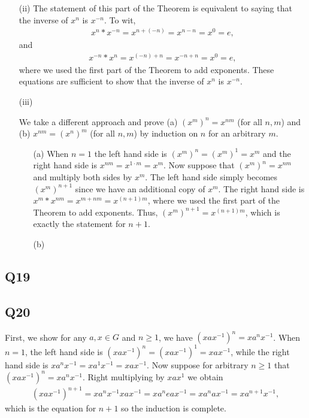 \documentclass[12pt]{article}
\numberwithin{theorem}{section}
\numberwithin{equation}{section}
\numberwithin{remark}{section}
\numberwithin{definition}{section}
\numberwithin{theorem}{section}
\numberwithin{lemma}{section}
\numberwithin{example}{section}
\begin{document}
\begin{itemize}
	\item[(ii)]{The statement of this part of the Theorem is equivalent to saying that the inverse of $x^n$ is $x^{-n}$. To wit,
	\begin{align*}
		x^n * x^{-n} = x^{n+(-n)}=x^{n-n}=x^0=e,
	\end{align*}
	and
	\begin{align*}
		x^{-n} * x^n = x^{(-n)+n}=x^{-n+n}=x^0=e,
	\end{align*}
	where we used the first part of the Theorem to add exponents. These equations are sufficient to show that the inverse of $x^n$ is $x^{-n}$.}
	\item[(iii)]{We take a different approach and prove (a) $(x^m)^n=x^{nm}$ (for all $n,m$) and (b) $x^{nm}=(x^n)^m$ (for all $n,m$) by induction on $n$ for an arbitrary $m$.
	\begin{itemize}
		\item[(a)]{When $n=1$ the left hand side is $(x^m)^n=(x^m)^1=x^m$ and the right hand side is $x^{nm}=x^{1\cdot m}=x^m$. Now suppose that $(x^m)^n=x^{nm}$ and multiply both sides by $x^m$. The left hand side simply becomes $(x^m)^{n+1}$ since we have an additional copy of $x^m$. The right hand side is $x^m*x^{nm}=x^{m+nm}=x^{(n+1)m}$, where we used the first part of the Theorem to add exponents. Thus, $(x^m)^{n+1}=x^{(n+1)m}$, which is exactly the statement for $n+1$.}
		\item[(b)]{}
	\end{itemize}}
\end{itemize}

\subsection{Q19}

\subsection{Q20}

First, we show for any $a,x\in G$ and $n\ge 1$, we have $(xax^{-1})^n=xa^nx^{-1}$. When $n=1$, the left hand side is $(xax^{-1})^n=(xax^{-1})^1=xax^{-1}$, while the right hand side is $xa^nx^{-1}=xa^1x^{-1}=xax^{-1}$. Now suppose for arbitrary $n\ge1$ that $(xax^{-1})^n=xa^nx^{-1}$. Right multiplying by $xax^{1}$ we obtain
\begin{align*}
	(xax^{-1})^{n+1}=xa^nx^{-1}xax^{-1}=xa^neax^{-1}=xa^nax^{-1}=xa^{n+1}x^{-1},
\end{align*}
which is the equation for $n+1$ so the induction is complete. 
\end{document}
